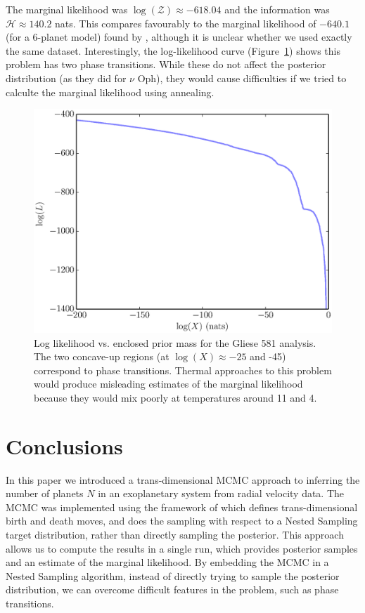 \documentclass[useAMS,usenatbib]{mn2e}
\begin{document}
The marginal likelihood was $\log(\mathcal{Z}) \approx -618.04$ and the
information was $\mathcal{H} \approx 140.2$ nats. This compares favourably
to the marginal likelihood of $-640.1$ (for a 6-planet model)
found by \citet{fengji}, although it is unclear whether we used exactly the
same dataset.
Interestingly, the log-likelihood curve (Figure~\ref{fig:logl})
shows this problem has two phase transitions. While these do not affect the
posterior distribution (as they did for $\nu$ Oph), they would cause difficulties
if we tried to calculte the marginal likelihood using annealing.

\begin{figure}
\includegraphics[scale=0.45]{Figures/logl.eps}
\caption{Log likelihood vs. enclosed prior mass for the Gliese 581 analysis.
The two concave-up regions (at $\log(X) \approx -25$ and -45) correspond to
phase transitions. Thermal approaches to this problem would produce misleading
estimates of the marginal likelihood because they would mix poorly at temperatures
around 11 and 4.
\label{fig:logl}}
\end{figure}


\section{Conclusions}
In this paper we introduced a trans-dimensional MCMC approach to inferring
the number of planets $N$ in an exoplanetary system from radial velocity data.
The MCMC was implemented using the framework of \citet{rjobject} which
defines trans-dimensional birth and death moves, and does the sampling
with respect to a Nested Sampling target distribution, rather than directly
sampling the posterior. This approach allows us to compute the results in a
single run, which provides posterior samples and an estimate of the marginal
likelihood. By embedding the MCMC in a Nested Sampling algorithm, instead of
directly trying to sample the posterior distribution, we can overcome difficult
features in the problem, such as phase transitions.
\end{document}

